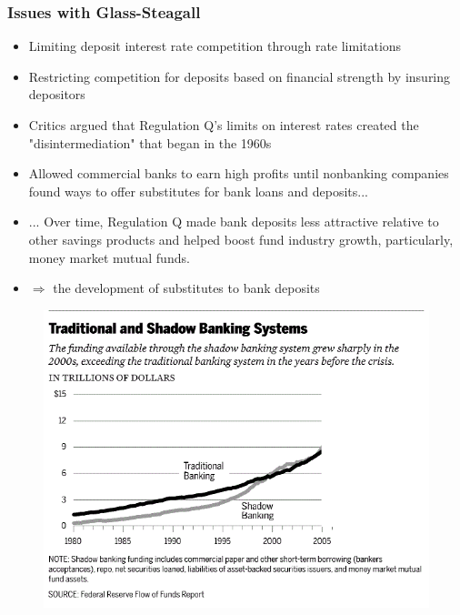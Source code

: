 \documentclass[11pt]{beamer}
\begin{document}
\begin{frame}
\frametitle{Issues with Glass-Steagall}

\begin{itemize}
\item Limiting deposit interest rate competition through rate limitations
\item Restricting competition for deposits based on financial strength by insuring depositors
\item Critics argued that Regulation Q's limits on interest rates created the "disintermediation" that began in the 1960s
\item Allowed commercial banks to earn high profits until nonbanking companies found ways to offer substitutes for bank loans and deposits...
\item ... Over time, Regulation Q made bank deposits less attractive relative to other savings products and helped boost fund industry growth,
particularly, money market mutual funds.
\item $\Rightarrow$ the development of substitutes to bank deposits
\end{itemize}
\end{frame}


\begin{frame}
\begin{figure}
\includegraphics[width=1 \textwidth]{Figures/SB1.png}
\end{figure}
\end{frame}
\end{document}
